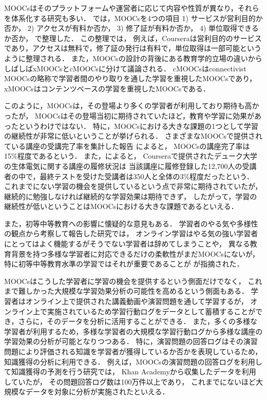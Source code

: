 MOOCsはそのプラットフォームや運営者に応じて内容や性質が異なり，それらを体系化する研究も多い．
\cite{yuan2013moocs}では，MOOCsを4つの項目
1) サービスが営利目的か否か，
2) アクセスが有料か否か，
3) 修了証が有料か否か，
4) 単位取得できるか否か，
で整理した．
この整理では，
例えば，Courseraは営利目的のサービスであり，アクセスは無料で，修了証の発行は有料で，単位取得は一部可能というように整理される．
また，MOOCsの設計の背後にある教育学的立場の違いからしばしばxMOOCsとcMOOCsに分けて議論される\cite{daniel2012making}．
cMOOCsはconnectivist MOOCsの略称で学習者間のやり取りを通した学習を重視したMOOCsであり，
xMOOCsはコンテンツベースの学習を重視したMOOCsである．



このように，MOOCsは，その登場より多くの学習者が利用しており期待も高かったが，
MOOCsはその登場当初に期待されていたほど，教育や学習に効果があったというわけではない．
特に，MOOCsにおける大きな課題の1つとして学習の継続性が非常に低いということが挙げられる．
さまざまなMOOCsで提供されている講座の受講完了率を集計した報告
\cite{jordan2013mooc}によると，
MOOCsの講座完了率は15\%程度であるという．
また，\cite{rivard2013measuring}によると，
Courseraで提供されたデューク大学の生体電気に関する講座の履修状況は
当該講座に履修登録した12,700人の受講者の中で，最終テストを受けた受講者は350人と全体の3\%程度だったという．
これまでにない学習の機会を提供しているという点で非常に期待されていたが，
継続的に勉強しなければ継続的な学習効果は期待できず，
したがって，学習の継続性が低いということはMOOCsにおける大きな課題であるといえる．

また，初等中等教育への影響に懐疑的な意見もある．
学習者のやる気や多様性の観点から考察して報告した研究\cite{bock2013virtual}では，
オンライン学習はやる気の強い学習者にとってはよく機能するがそうでない学習者は辞めてしまうことや，
異なる教育背景を持つ多様な学習者に対応できるだけの柔軟性がまだMOOCsにないが，特に初等中等教育水準の学習ではそれが重要であることが
が指摘された．


MOOCsはこうした学習者に学習の機会を提供するという側面だけでなく，
これまで難しかった大規模な学習効果分析の可能性を高めるという側面もある．
学習者はオンライン上で提供された講義動画や演習問題を通して学習するが，
オンライン上で実施されているため学習行動ログをデータとして蓄積することができ，さらに，そのデータを分析に活用することができる．
また，多くの多様な学習者が利用するため，多様な学習者の大規模な学習行動ログから多様な講座の学習効果の分析が可能となりつつある．
特に，演習問題の回答ログはその演習問題により評価される知識を学習者が獲得しているか否かを表現しているため，知識獲得の分析に利用できる．
例えば，MOOCsの演習問題の回答ログを利用して知識獲得の予測を行う研究\cite{machardy2015toward}では，
Khan Academyから収集したデータを利用していたが，
その問題回答ログ数は100万件以上であり，
これまでにないほど大規模なデータを対象に分析が実施されたといえる．


